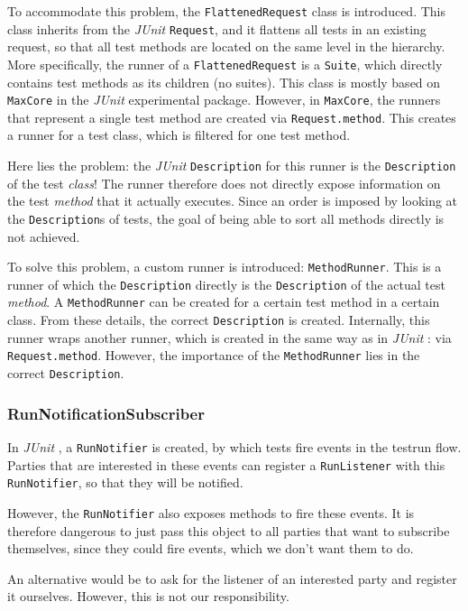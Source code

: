 \documentclass[i2]{oss}
\newcommand{\class}[1]{\texttt{#1}}
\newcommand{\junit}{\emph{JUnit }}
\begin{document}
To accommodate this problem, the \class{FlattenedRequest} class is introduced.
This class inherits from the \junit \class{Request}, and it flattens all tests in an existing request, so that all test methods are located on the same level in the hierarchy.
More specifically, the runner of a \class{FlattenedRequest} is a \class{Suite}, which directly contains test methods as its children (no suites).
This class is mostly based on \class{MaxCore} in the \junit experimental package.
However, in \class{MaxCore}, the runners that represent a single test method are created via \class{Request.method}.
This creates a runner for a test class, which is filtered for one test method.

Here lies the problem: the \junit \class{Description} for this runner is the \class{Description} of the test \emph{class}!
The runner therefore does not directly expose information on the test \emph{method} that it actually executes.
Since an order is imposed by looking at the \class{Description}s of tests, the goal of being able to sort all methods directly is not achieved.

To solve this problem, a custom runner is introduced: \class{MethodRunner}.
This is a runner of which the \class{Description} directly is the \class{Description} of the actual test \emph{method}.
A \class{MethodRunner} can be created for a certain test method in a certain class.
From these details, the correct \class{Description} is created.
Internally, this runner wraps another runner, which is created in the same way as in \junit: via \class{Request.method}.
However, the importance of the \class{MethodRunner} lies in the correct \class{Description}.

\subsubsection{RunNotificationSubscriber}

In \junit, a \class{RunNotifier} is created, by which tests fire events in the testrun flow.
Parties that are interested in these events can register a \class{RunListener} with this \class{RunNotifier}, so that they will be notified.

However, the \class{RunNotifier} also exposes methods to fire these events.
It is therefore dangerous to just pass this object to all parties that want to subscribe themselves, since they could fire events, which we don't want them to do.

An alternative would be to ask for the listener of an interested party and register it ourselves.
However, this is not our responsibility.
\end{document}
